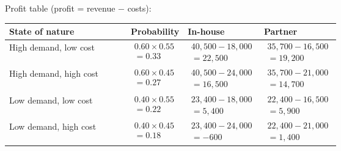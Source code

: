 \begin{ExamProblems}
		Profit table (profit = revenue $-$ costs):
		\begin{center}
			\begin{tabular}{l p{0.17\linewidth} p{0.23\linewidth} p{0.23\linewidth}}
				\toprule
				State of nature & Probability & In-house & Partner \\
				\midrule
				High demand, low cost &
				$\begin{array}{l}
					0.60 \times 0.55\\
					= 0.33
				\end{array}$ &
				$\begin{array}{l}
					40{,}500 - 18{,}000\\
					= 22{,}500
				\end{array}$ &
				$\begin{array}{l}
					35{,}700 - 16{,}500\\
					= 19{,}200
				\end{array}$ \\
				High demand, high cost &
				$\begin{array}{l}
					0.60 \times 0.45\\
					= 0.27
				\end{array}$ &
				$\begin{array}{l}
					40{,}500 - 24{,}000\\
					= 16{,}500
				\end{array}$ &
				$\begin{array}{l}
					35{,}700 - 21{,}000\\
					= 14{,}700
				\end{array}$ \\
				Low demand, low cost &
				$\begin{array}{l}
					0.40 \times 0.55\\
					= 0.22
				\end{array}$ &
				$\begin{array}{l}
					23{,}400 - 18{,}000\\
					= 5{,}400
				\end{array}$ &
				$\begin{array}{l}
					22{,}400 - 16{,}500\\
					= 5{,}900
				\end{array}$ \\
				Low demand, high cost &
				$\begin{array}{l}
					0.40 \times 0.45\\
					= 0.18
				\end{array}$ &
				$\begin{array}{l}
					23{,}400 - 24{,}000\\
					= -600
				\end{array}$ &
				$\begin{array}{l}
					22{,}400 - 21{,}000\\
					= 1{,}400
				\end{array}$ \\
				\bottomrule
			\end{tabular}
		\end{center}
		

\end{ExamProblems}
